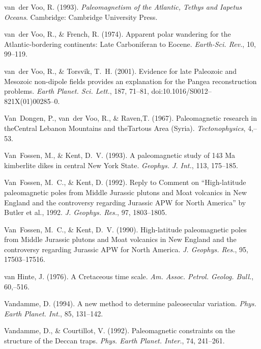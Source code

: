 \documentclass[,plain]{tauxe}
\begin{document}
\begin{thebibliography}{}
\bibitem{}%
van~der Voo, R. (1993).
{\it Paleomagnetism of the Atlantic, Tethys and Iapetus Oceans}.
Cambridge: Cambridge University Press.

\bibitem{}%
van~der Voo, R., \& French, R. (1974).
Apparent polar wandering for the Atlantic-bordering continents: Late Carboniferan to Eocene.
{\it Earth-Sci. Rev.}, 10, 99--119.

\bibitem{}%
van~der Voo, R., \& Torsvik, T.~H. (2001).
Evidence for late Paleozoic and Mesozoic non-dipole fields provides an explanation for the Pangea reconstruction problems.
{\it Earth Planet. Sci. Lett.}, 187, 71--81, doi:10.1016/S0012--821X(01)00285--0.

\bibitem{}%
Van~Dongen, P., van~der Voo, R., \& Raven,\break T. (1967).
Paleomagnetic research in the\break Central Lebanon Mountains and the\break Tartous Area (Syria).
{\it Tectonophysics}, 4,--53.

\bibitem{}%
Van~Fossen, M., \& Kent, D.~V. (1993).
A paleomagnetic study of 143 Ma kimberlite dikes in central New York State.
{\it Geophys. J. Int.}, 113, 175--185.

\bibitem{}%
Van~Fossen, M.~C., \& Kent, D. (1992).
Reply to Comment on ``High-latitude paleomagnetic poles from Middle Jurassic plutons and Moat volcanics in New England and the controversy regarding Jurassic {APW} for North America'' by Butler et al., 1992.
{\it J. Geophys. Res.}, 97, 1803--1805.

\bibitem{}%
Van~Fossen, M.~C., \& Kent, D.~V. (1990).
High-latitude paleomagnetic poles from Middle Jurassic plutons and Moat volcanics in New England and the controversy regarding Jurassic {APW} for North America.
{\it J. Geophys. Res.}, 95, 17503--17516.

\bibitem{}%
van Hinte, J. (1976).
A Cretaceous time scale.
{\it Am. Assoc. Petrol. Geolog. Bull.}, 60,--516.

\bibitem{}%
Vandamme, D. (1994).
A new method to determine paleosecular variation.
{\it Phys. Earth Planet. Int.}, 85, 131--142.

\bibitem{}%
Vandamme, D., \& Courtillot, V. (1992).
Paleomagnetic constraints on the structure of the Deccan traps.
{\it Phys. Earth Planet. Inter.}, 74, 241--261.


\end{thebibliography}
\end{document}
